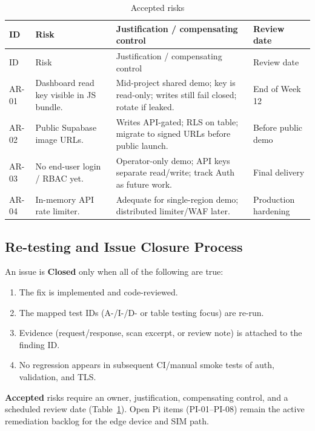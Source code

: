\documentclass[12pt]{article}
\newcommand{\toprule}{\hline}
\newcommand{\midrule}{\hline}
\newcommand{\bottomrule}{\hline}
\begin{document}
\begin{longtable}{p{}p{}p{}p{}}
\caption{Accepted risks}\label{tab:accepted}\\
\toprule
ID & Risk & Justification / compensating control & Review date \\
\midrule
\endfirsthead
\toprule
ID & Risk & Justification / compensating control & Review date \\
\midrule
\endhead
AR-01 & Dashboard read key visible in JS bundle. & Mid-project shared demo; key is read-only; writes still fail closed; rotate if leaked. & End of Week 12 \\
AR-02 & Public Supabase image URLs. & Writes API-gated; RLS on table; migrate to signed URLs before public launch. & Before public demo \\
AR-03 & No end-user login / RBAC yet. & Operator-only demo; API keys separate read/write; track Auth as future work. & Final delivery \\
AR-04 & In-memory API rate limiter. & Adequate for single-region demo; distributed limiter/WAF later. & Production hardening \\
\bottomrule
\end{longtable}

\subsection{Re-testing and Issue Closure Process}

An issue is \textbf{Closed} only when all of the following are true:

\begin{enumerate}
    \item The fix is implemented and code-reviewed.
    \item The mapped test IDs (A-/I-/D- or table testing focus) are re-run.
    \item Evidence (request/response, scan excerpt, or review note) is attached to
          the finding ID.
    \item No regression appears in subsequent CI/manual smoke tests of auth,
          validation, and TLS.
\end{enumerate}

\textbf{Accepted} risks require an owner, justification, compensating control,
and a scheduled review date (Table~\ref{tab:accepted}). Open Pi items (PI-01--PI-08)
remain the active remediation backlog for the edge device and SIM path.
\end{document}

